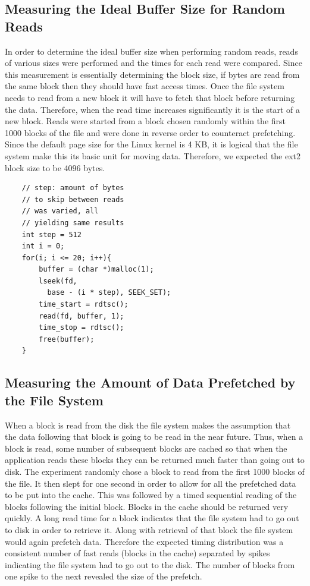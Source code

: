 \documentclass[letterpaper,twocolumn,10pt]{article}
\begin{document}
\subsection{Measuring the Ideal Buffer Size for Random Reads}

In order to determine the ideal buffer size when performing random reads, reads of various sizes were performed and the times for each read were compared. 
Since this measurement is essentially determining the block size, if bytes are read from the same block then they should have fast access times. 
Once the file system needs to read from a new block it will have to fetch that block before returning the data. 
Therefore, when the read time increases significantly it is the start of a new block.
Reads were started from a block chosen randomly within the first 1000 blocks of the file and were done in reverse order to counteract prefetching. 
Since the default page size for the Linux kernel is 4 KB, it is logical that the file system make this its basic unit for moving data. 
Therefore, we expected the ext2 block size to be 4096 bytes.

\begin{verbatim}
    // step: amount of bytes 
    // to skip between reads
    // was varied, all 
    // yielding same results
    int step = 512  
    int i = 0;
    for(i; i <= 20; i++){ 
        buffer = (char *)malloc(1);
        lseek(fd, 
          base - (i * step), SEEK_SET);
        time_start = rdtsc();
        read(fd, buffer, 1);
        time_stop = rdtsc();
        free(buffer);
    }
\end{verbatim} 

\subsection{Measuring the Amount of Data Prefetched by the File System}
When a block is read from the disk the file system makes the assumption that the data following that block is going to be read in the near future. 
Thus, when a block is read, some number of subsequent blocks are cached so that when the application reads these blocks they can be returned much faster than going out to disk. 
The experiment randomly chose a block to read from the first 1000 blocks of the file. 
It then slept for one second in order to allow for all the prefetched data to be put into the cache. 
This was followed by a timed sequential reading of the blocks following the initial block.
Blocks in the cache should be returned very quickly. 
A long read time for a block indicates that the file system had to go out to disk in order to retrieve it. 
Along with retrieval of that block the file system would again prefetch data. 
Therefore the expected timing distribution was a consistent number of fast reads (blocks in the cache) separated by spikes indicating the file system had to go out to the disk. 
The number of blocks from one spike to the next revealed the size of the prefetch.
\end{document}
